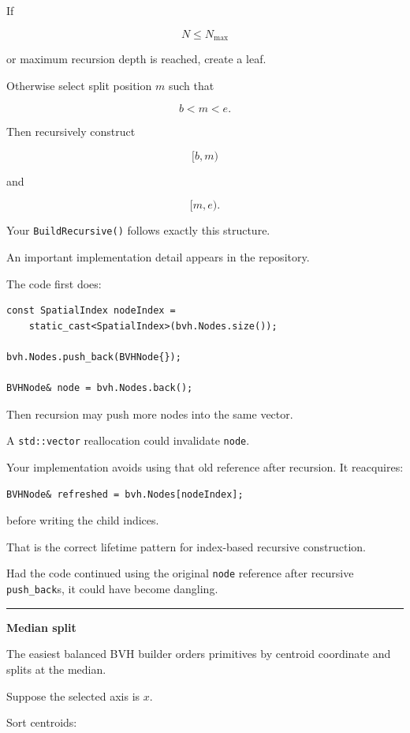If

\[
N\le N_{\max}
\]

or maximum recursion depth is reached, create a leaf.

Otherwise select split position \(m\) such that

\[
b<m<e.
\]

Then recursively construct

\[
[b,m)
\]

and

\[
[m,e).
\]

Your \texttt{BuildRecursive()} follows exactly this structure.

An important implementation detail appears in the repository.

The code first does:

\begin{verbatim}
const SpatialIndex nodeIndex =
    static_cast<SpatialIndex>(bvh.Nodes.size());

bvh.Nodes.push_back(BVHNode{});

BVHNode& node = bvh.Nodes.back();
\end{verbatim}

Then recursion may push more nodes into the same vector.

A \texttt{std::vector} reallocation could invalidate \texttt{node}.

Your implementation avoids using that old reference after recursion. It reacquires:

\begin{verbatim}
BVHNode& refreshed = bvh.Nodes[nodeIndex];
\end{verbatim}

before writing the child indices.

That is the correct lifetime pattern for index-based recursive construction.

Had the code continued using the original \texttt{node} reference after recursive \texttt{push\_back}s, it could have become dangling.

\begin{center}\rule{0.5\linewidth}{0.5pt}\end{center}

\textbf{Median split}

The easiest balanced BVH builder orders primitives by centroid coordinate and splits at the median.

Suppose the selected axis is \(x\).

Sort centroids:

